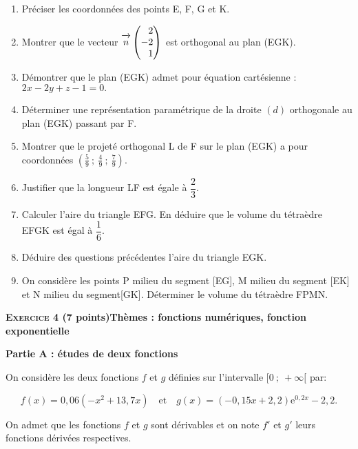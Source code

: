 \documentclass[10pt,a4paper]{article}
\newcommand{\vect}[1]{\overrightarrow{\,\mathstrut#1\,}}
\begin{document}
\medskip

\begin{enumerate}
\item Préciser les coordonnées des points E, F{}, G et K.
\item Montrer que le vecteur $\vect{n}\begin{pmatrix}\phantom{-}2\\-2\\\phantom{-}1\end{pmatrix}$ est orthogonal au plan (EGK).
\item Démontrer que le plan (EGK) admet pour équation cartésienne : $2x - 2y + z - 1 = 0.$
\item Déterminer une représentation paramétrique de la droite $(d)$ orthogonale au plan (EGK)
passant par F{}.
\item Montrer que le projeté orthogonal L de F sur le plan (EGK) a pour coordonnées $\left(\frac59~;~\frac49~;~\frac79\right)$.
\item Justifier que la longueur LF est égale à $\dfrac23$.
\item Calculer l'aire du triangle EFG. En déduire que le volume du tétraèdre EFGK est égal à $\dfrac16$.
\item Déduire des questions précédentes l'aire du triangle EGK.
\item On considère les points P milieu du segment [EG], M milieu du segment [EK] et N milieu du segment[GK]. Déterminer le volume du tétraèdre FPMN.
\end{enumerate}

\bigskip

\textbf{\textsc{Exercice 4} \quad (7 points)\hfill Thèmes : fonctions numériques, fonction exponentielle}

\begin{center}

\textbf{Partie A : études de deux fonctions}

\end{center}

On considère les deux fonctions $f$ et $g$ définies sur l'intervalle $[0~;~+\infty[$ par:

\[f(x) = 0,06\left(-x^2 +13,7x\right)\quad  \text{et}\quad  g(x) = (-0,15x + 2,2)\text{e}^{0,2x} - 2,2.\]

On admet que les fonctions $f$ et $g$ sont dérivables et on note $f'$ et $g'$ leurs fonctions dérivées respectives.
\end{document}
